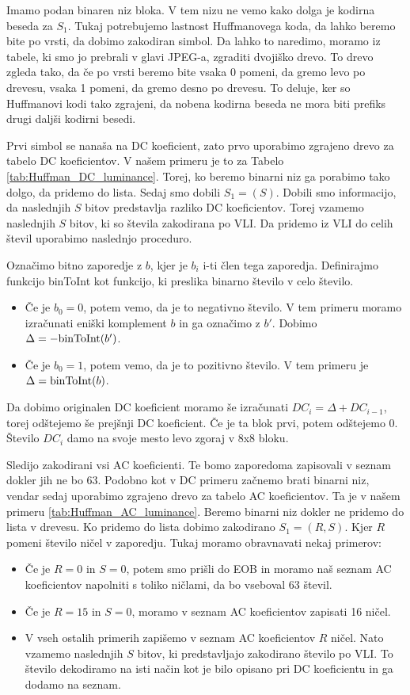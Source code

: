 \documentclass[a4paper,12pt,openright]{book}
\begin{document}
Imamo podan binaren niz bloka. V tem nizu ne vemo kako dolga je kodirna beseda za $S_1$. Tukaj potrebujemo lastnost Huffmanovega koda, da lahko beremo bite po vrsti, da dobimo zakodiran simbol. Da lahko to naredimo, moramo iz tabele, ki smo jo prebrali v glavi JPEG-a, zgraditi dvojiško drevo. To drevo zgleda tako, da če po vrsti beremo bite vsaka 0 pomeni, da gremo levo po drevesu, vsaka 1 pomeni, da gremo desno po drevesu. To deluje, ker so Huffmanovi kodi tako zgrajeni, da nobena kodirna beseda ne mora biti prefiks drugi daljši kodirni besedi.\par
Prvi simbol se nanaša na DC koeficient, zato prvo uporabimo zgrajeno drevo za tabelo DC koeficientov. V našem primeru je to za Tabelo \ref{tab:Huffman_DC_luminance}. Torej, ko beremo binarni niz ga porabimo tako dolgo, da pridemo do lista. Sedaj smo dobili $S_1 = (S)$. Dobili smo informacijo, da naslednjih $S$ bitov predstavlja razliko DC koeficientov. Torej vzamemo naslednjih $S$ bitov, ki so števila zakodirana po VLI. Da pridemo iz VLI do celih števil uporabimo naslednjo proceduro.\par
Označimo bitno zaporedje z $b$, kjer je $b_i$ i-ti člen tega zaporedja. Definirajmo funkcijo binToInt kot funkcijo, ki preslika binarno število v celo število. 
\begin{itemize}
  \item Če je $b_0 = 0$, potem vemo, da je to negativno število. V tem primeru moramo izračunati eniški komplement $b$ in ga označimo z $b'$. Dobimo $\Delta = -\hbox{binToInt}(b')$. 
  \item Če je $b_0 = 1$, potem vemo, da je to pozitivno število. V tem primeru je $\Delta = \hbox{binToInt}(b)$. 
\end{itemize}
Da dobimo originalen DC koeficient moramo še izračunati $DC_i = \Delta + DC_{i-1}$, torej odštejemo še prejšnji DC koeficient. Če je ta blok prvi, potem odštejemo 0. Število $DC_i$ damo na svoje mesto levo zgoraj v 8x8 bloku.\par
Sledijo zakodirani vsi AC koeficienti. Te bomo zaporedoma zapisovali v seznam dokler jih ne bo 63. Podobno kot v DC primeru začnemo brati binarni niz, vendar sedaj uporabimo zgrajeno drevo za tabelo AC koeficientov. Ta je v našem primeru \ref{tab:Huffman_AC_luminance}. Beremo binarni niz dokler ne pridemo do lista v drevesu. Ko pridemo do lista dobimo zakodirano $S_1 = (R, S)$. Kjer $R$ pomeni število ničel v zaporedju. Tukaj moramo obravnavati nekaj primerov:
\begin{itemize}
  \item Če je $R = 0$ in $S = 0$, potem smo prišli do EOB in moramo naš seznam AC koeficientov napolniti s toliko ničlami, da bo vseboval 63 števil.
  \item Če je $R = 15$ in $S = 0$, moramo v seznam AC koeficientov zapisati 16 ničel.
  \item V vseh ostalih primerih zapišemo v seznam AC koeficientov $R$ ničel. Nato vzamemo naslednjih $S$ bitov, ki predstavljajo zakodirano število po VLI. To število dekodiramo na isti način kot je bilo opisano pri DC koeficientu in ga dodamo na seznam. 
\end{itemize}
\end{document}

